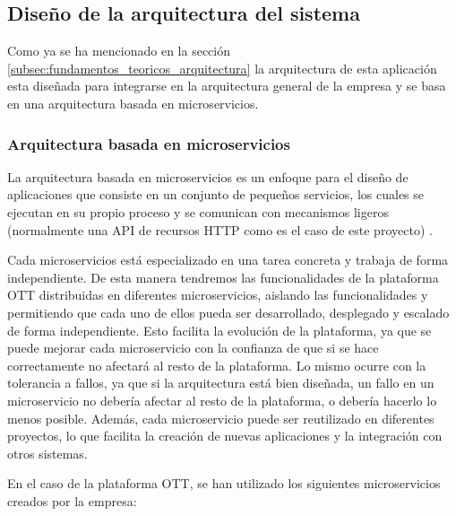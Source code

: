 \subsection{Diseño de la arquitectura del sistema}
\label{subsec:diseno:ott:arquitectura}

Como ya se ha mencionado en la sección \ref{subsec:fundamentos_teoricos_arquitectura}
la arquitectura de esta aplicación esta diseñada para integrarse en la arquitectura general 
de la empresa y se basa en una arquitectura basada en microservicios. 

\subsubsection{Arquitectura basada en microservicios}
\label{subsec:diseno:ott:arquitectura_microservicios}

La arquitectura basada en microservicios es un enfoque para el diseño de aplicaciones que consiste en
un conjunto de pequeños servicios, los cuales se ejecutan en su propio proceso y se comunican con
mecanismos ligeros (normalmente una API de recursos HTTP como es el caso de este proyecto) \cite{Microservices}.

Cada microservicios está especializado en una tarea concreta y trabaja de forma independiente. De esta manera
tendremos las funcionalidades de la plataforma OTT distribuidas en diferentes microservicios, aislando las funcionalidades
y permitiendo que cada uno de ellos pueda ser desarrollado, desplegado y escalado de forma independiente. Esto facilita
la evolución de la plataforma, ya que se puede mejorar cada microservicio con la confianza de que si se hace correctamente
no afectará al resto de la plataforma. Lo mismo ocurre con la tolerancia a fallos, ya que si la arquitectura está bien
diseñada, un fallo en un microservicio no debería afectar al resto de la plataforma, o debería hacerlo lo menos posible.
Además, cada microservicio puede ser reutilizado en diferentes proyectos, lo que facilita la creación de nuevas aplicaciones
y la integración con otros sistemas.

En el caso de la plataforma OTT, se han utilizado los siguientes microservicios creados por la empresa:

